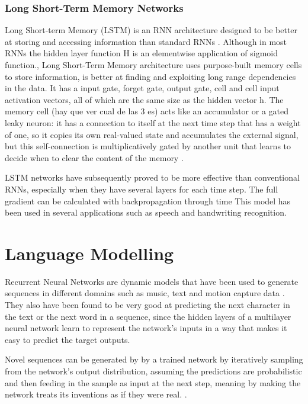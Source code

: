 \subsubsection{Long Short-Term Memory Networks}
Long Short-term Memory (LSTM) is an RNN architecture designed to be better at storing and accessing information than standard RNNs \cite{graves2013generating}.
Although in most RNNs the hidden layer function H is an elementwise application of sigmoid function.,  Long Short-Term Memory  architecture uses purpose-built memory cells to store information, is better at finding and exploiting long range dependencies in the data. It has a input gate, forget gate, output gate, cell and cell input activation vectors, all of which are the same size as the hidden vector h. \cite{graves2013generating}
The memory cell (hay que ver cual de las 3 es) acts like an accumulator or a gated leaky neuron: it has a connection to itself at the next time step that has a weight of one, so it copies its own real-valued state and accumulates the external signal, but this self-connection is multiplicatively gated by another unit that learns to decide when to clear the content of the memory \cite{lecun2015deep}.

LSTM networks have subsequently proved to be more effective than conventional RNNs, especially when they have several layers for each time step\cite{lecun2015deep}.
The full gradient can be calculated with backpropagation through time \cite{graves2013generating}
This model has been used in several applications such as speech and handwriting recognition.\cite{graves2013generating}



\section{Language Modelling}
Recurrent Neural Networks are dynamic models that have been used to generate sequences in different domains such as music, text and motion capture data \cite{graves2013generating}.
They also have been found to be very good at predicting the next character in the text or the next word in a sequence, since the hidden layers of a multilayer neural network learn to represent the network’s inputs in a way that makes it easy to predict the target outputs.\cite{lecun2015deep}

Novel sequences can be generated by by a trained network by iteratively sampling from the network's output distribution, assuming the predictions are probabilistic and then feeding in the sample as input at the next step, meaning by making the network treats its inventions as if they were real. 
\cite{graves2013generating}.


